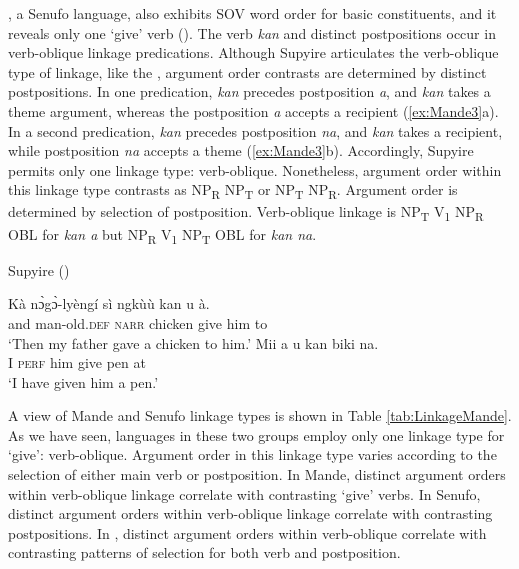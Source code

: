 \documentclass[output=paper,colorlinks,citecolor=brown]{langscibook}
\begin{document}
\begin{sloppypar}
, a Senufo language, also exhibits SOV word order for basic constituents, and it reveals only one ‘give’ verb (\cite{Carlson1994}). The verb \textit{kan} and distinct postpositions occur in verb-oblique linkage predications. Although Supyire articulates the verb-oblique type of linkage, like the , argument order contrasts are determined by distinct postpositions. In one predication, \textit{kan} precedes postposition \textit{a}, and \textit{kan} takes a theme argument, whereas the postposition \textit{a} accepts a recipient (\ref{ex:Mande3}a). In a second predication, \textit{kan} precedes postposition \textit{na}, and \textit{kan} takes a recipient, while postposition \textit{na} accepts a theme (\ref{ex:Mande3}b). Accordingly, Supyire permits only one linkage type: verb-oblique. Nonetheless, argument order within this linkage type contrasts as NP\textsubscript{R} NP\textsubscript{T} or NP\textsubscript{T} NP\textsubscript{R}. Argument order is determined by selection of postposition. Verb-oblique linkage is NP\textsubscript{T} V\textsubscript{1} NP\textsubscript{R} OBL for \textit{kan a} but NP\textsubscript{R} V\textsubscript{1} NP\textsubscript{T} OBL for \textit{kan na}.
\end{sloppypar}

\ea \label{ex:Mande3} Supyire (\cite [270, 400] {Carlson1994})
\begin{xlist}
\ex
\gll Kà		nɔ̀gɔ̀-lyèngí		sì				ngkùù		kan		u			à. \\
		and	man-old.\textsc{def}	\textsc{narr}		chicken	give		him	to \\
\glt						‘Then my father gave a chicken to him.’
\ex 
\gll Mii	a				u			kan		biki	na.\\
						I			\textsc{perf}	him	give		pen	at	\\
\glt 						‘I have given him a pen.’
\end{xlist}
\z

A view of Mande and Senufo linkage types is shown in Table \ref{tab:LinkageMande}. As we have seen, languages in these two groups employ only one linkage type for ‘give’: verb-oblique. Argument order in this linkage type varies according to the selection of either main verb or postposition. In Mande, distinct argument orders within verb-oblique linkage correlate with contrasting ‘give’ verbs. In Senufo, distinct argument orders within verb-oblique linkage correlate with contrasting postpositions. In , distinct argument orders within verb-oblique correlate with contrasting patterns of selection for both verb and postposition.
\end{document}
